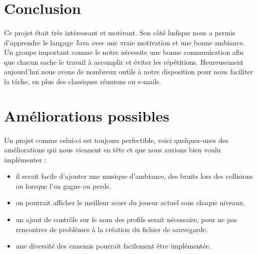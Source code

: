 \documentclass[a4paper,12pt]{report}
\begin{document}
\section{Conclusion}
\paragraph{}Ce projet était très intéressant et motivant. Son côté ludique nous a permis d'apprendre le langage Java avec une vraie motivation et une bonne ambiance. Un groupe important comme le notre nécessite une bonne communication afin que chacun sache le travail à accomplir et éviter les répétitions. Heureusement aujourd'hui nous avons de nombreux outils à notre disposition pour nous faciliter la tâche, en plus des classiques réunions ou e-mails.

\section{Améliorations possibles}
\paragraph{}Un projet comme celui-ci est toujours perfectible, voici quelques-unes des améliorations qui nous viennent en tête et que nous aurions bien voulu implémenter :
\begin{itemize}
\item il serait facile d'ajouter une musique d'ambiance, des bruits lors des collisions ou lorsque l'on gagne ou perds.
\item on pourrait afficher le meilleur score du joueur actuel sous chaque niveaux.
\item un ajout de contrôle sur le nom des profils serait nécessaire, pour ne pas rencontrer de problèmes à la création du fichier de sauvegarde.
\item une diversité des ennemis pourrait facilement être implémentée.
\end{itemize}
\end{document}
